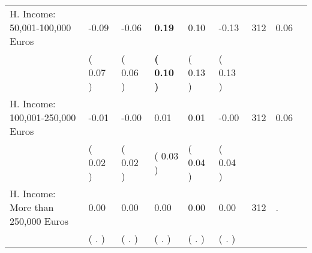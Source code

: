 \begin{tabular}{L{6.2cm} C{1.8cm} C{1.8cm} C{1.8cm} C{1.8cm} C{1.8cm} C{1.8cm} C{0.3cm} C{0.3cm}}
H. Income: 50,001-100,000 Euros &     -0.09 &     -0.06 & \textbf{     0.19} &      0.10 &     -0.13  & 312 &       0.06 \\ 
 & (     0.07 ) & (     0.06 ) & \textbf{(     0.10 )} & (     0.13 ) & (     0.13 )  & \\
H. Income: 100,001-250,000 Euros &     -0.01 &     -0.00 &      0.01 &      0.01 &     -0.00  & 312 &       0.06 \\ 
 & (     0.02 ) & (     0.02 ) & (     0.03 ) & (     0.04 ) & (     0.04 )  & \\
H. Income: More than 250,000 Euros &      0.00 &      0.00 &      0.00 &      0.00 &      0.00  & 312 &          . \\ 
 & (        . ) & (        . ) & (        . ) & (        . ) & (        . )  & \\
\bottomrule
\end{tabular}
